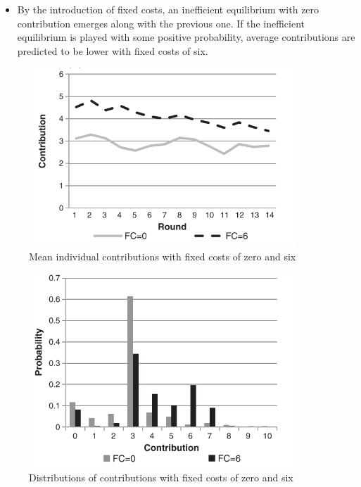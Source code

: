 \documentclass[../root]{subfiles}
\begin{document}
    \begin{itemize}
        \item By the introduction of fixed costs, an inefficient equilibrium with zero contribution emerges along with the previous one. If the inefficient equilibrium is played with some positive probability, average contributions are predicted to be lower with fixed costs of six.
    \end{itemize}

    \begin{figure}[H]
        \centering
        \includegraphics[width = 10cm]{0605kato/h2.png}
        \caption{Mean individual contributions with fixed costs of zero and six}
        \label{hypo2}
    \end{figure}

    \begin{figure}[H]
        \centering
        \includegraphics[width = 10cm]{0605kato/h2_add.png}
        \caption{Distributions of contributions with fixed costs of zero and six}
        \label{hypo2 add}
    \end{figure}
\end{document}
